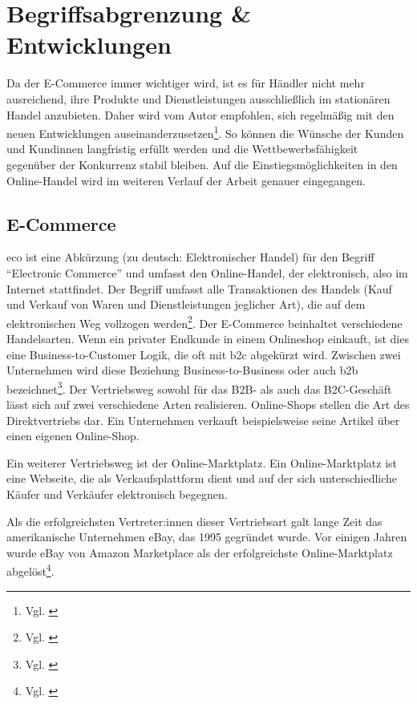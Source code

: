\clearpage
\section{Begriffsabgrenzung \& Entwicklungen}\label{hauptabschnitt_2}
Da der E-Commerce immer wichtiger wird, ist es für Händler nicht mehr ausreichend, ihre Produkte und Dienstleistungen ausschließlich im stationären Handel anzubieten. Daher wird vom Autor empfohlen, sich regelmäßig mit den neuen Entwicklungen auseinanderzusetzen\footnote{Vgl. \autocite [Online] {Handelsverband2022}}.
So können die Wünsche der Kunden und Kundinnen langfristig erfüllt werden und die Wettbewerbsfähigkeit gegenüber der Konkurrenz stabil bleiben. Auf die Einstiegsmöglichkeiten in den Online-Handel wird im weiteren Verlauf der Arbeit genauer eingegangen.

\subsection{E-Commerce}\label{unterabschnitt_2_1}
\ac{eco} ist eine Abkürzung (zu deutsch: Elektronischer Handel) für den Begriff “Electronic Commerce” und umfasst den Online-Handel, der elektronisch, also im Internet stattfindet. Der Begriff umfasst alle Transaktionen des Handels (Kauf und Verkauf von Waren und Dienstleistungen jeglicher Art), die auf dem elektronischen Weg vollzogen werden\footnote{Vgl. \autocite [S. 19] {Deges2020}}.
Der E-Commerce beinhaltet verschiedene Handelsarten. Wenn ein privater Endkunde in einem Onlineshop einkauft, ist dies eine Business-to-Customer Logik, die oft mit \ac{b2c} abgekürzt wird. Zwischen zwei Unternehmen wird diese Beziehung Business-to-Business oder auch \ac{b2b} bezeichnet\footnote{Vgl. \autocite [S.50] {Heinemann2021}}.
\newline
Der Vertriebsweg sowohl für das B2B- als auch das B2C-Geschäft lässt sich auf zwei verschiedene Arten realisieren. Online-Shops stellen die Art des Direktvertriebs dar. Ein Unternehmen verkauft beispielsweise seine Artikel über einen eigenen Online-Shop.
\newline

Ein weiterer Vertriebsweg ist der Online-Marktplatz. Ein Online-Marktplatz ist eine Webseite, die als Verkaufsplattform dient und auf der sich unterschiedliche Käufer und Verkäufer elektronisch begegnen.
\newline

Als die erfolgreichsten Vertreter:innen dieser Vertriebsart galt lange Zeit das amerikanische Unternehmen eBay, das 1995 gegründet wurde. Vor einigen Jahren wurde eBay von Amazon Marketplace als der erfolgreichste Online-Marktplatz abgelöst\footnote{Vgl. \autocite [Online] {Feldkircher2020}}.
\newline

